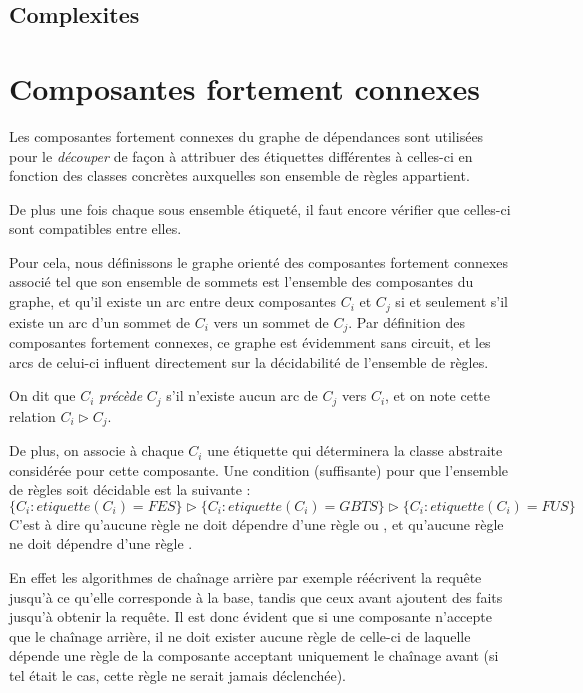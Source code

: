 \subsection{Complexites}\label{grd_complexites}
	

\section{Composantes fortement connexes}\label{grd_scc}

Les composantes fortement connexes du graphe de dépendances sont utilisées pour le 
{\em découper} de façon à attribuer des étiquettes différentes à celles-ci en fonction
des classes concrètes auxquelles son ensemble de règles appartient.

De plus une fois chaque sous ensemble étiqueté, il faut encore vérifier que celles-ci
sont compatibles entre elles.

Pour cela, nous définissons le graphe orienté des composantes fortement connexes associé
tel que son ensemble de sommets est l'ensemble des composantes du graphe, et
qu'il existe un arc entre deux composantes $C_i$ et $C_j$ si et seulement s'il existe un
arc d'un sommet de $C_i$ vers un sommet de $C_j$.
Par définition des composantes fortement connexes, ce graphe est évidemment sans
circuit, et les arcs de celui-ci influent directement sur la décidabilité de l'ensemble
de règles.

On dit que $C_i$ {\em précède} $C_j$ s'il n'existe aucun arc de $C_j$ vers $C_i$, et on
note cette relation $C_i \triangleright C_j$.

De plus,
on associe à chaque $C_i$ une étiquette qui déterminera la classe abstraite considérée pour
cette composante.
Une condition (suffisante)%
pour que l'ensemble de règles soit décidable est la suivante :\\
$\{C_i : etiquette(C_i) = FES\} \triangleright \{C_i : etiquette(C_i) = GBTS\} \triangleright
\{C_i : etiquette(C_i) = FUS\}$
C'est à dire qu'aucune règle \fes ne doit dépendre d'une règle \fus ou \gbts, et
qu'aucune règle \gbts ne doit dépendre d'une règle \fus.

En effet les algorithmes de chaînage arrière par exemple réécrivent la requête jusqu'à ce
qu'elle corresponde à la base, tandis que ceux avant ajoutent des faits jusqu'à obtenir
la requête. Il est donc évident que si une composante n'accepte que le chaînage arrière,
il ne doit exister aucune règle de celle-ci de laquelle dépende une règle de la
composante acceptant uniquement le chaînage avant (si tel était le cas, cette règle ne
serait jamais déclenchée).



